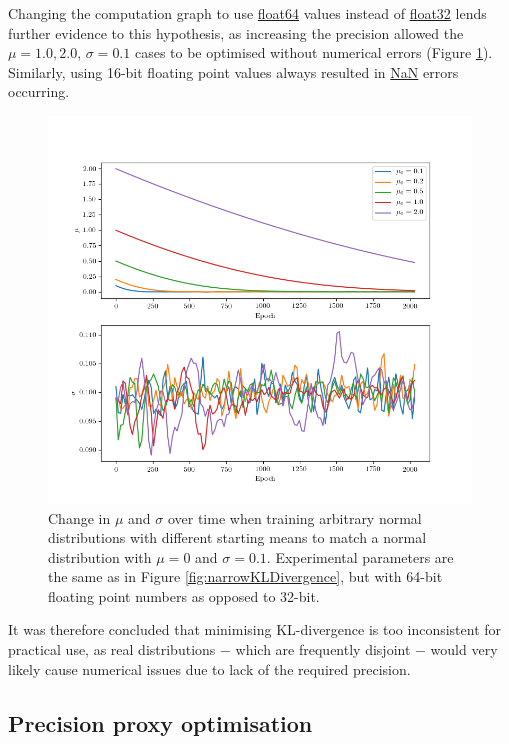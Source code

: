 \documentclass[../../main.tex]{subfiles}
\begin{document}
Changing the computation graph to use \url{float64} values instead of \url{float32} lends further evidence to this hypothesis, as increasing the precision allowed the $\mu=1.0,2.0$, $\sigma=0.1$ cases to be optimised without numerical errors (Figure \ref{fig:narrowKLDivergenceFloat64}).
Similarly, using 16-bit floating point values always resulted in \url{NaN} errors occurring.
\begin{figure}[H]
    \begin{center}
    \includegraphics[width=\textwidth]{narrowKLDivergenceFloat64}
    \caption{
        Change in $\mu$ and $\sigma$ over time when training arbitrary normal distributions with different starting means to match a normal distribution with $\mu=0$ and $\sigma=0.1$. 
        Experimental parameters are the same as in Figure \ref{fig:narrowKLDivergence}, but with 64-bit floating point numbers as opposed to 32-bit.
    }
    \label{fig:narrowKLDivergenceFloat64}
    \end{center}
\end{figure}
It was therefore concluded that minimising KL-divergence is too inconsistent for practical use, as real distributions $-$ which are frequently disjoint $-$ would very likely cause numerical issues due to lack of the required precision.

\subsection{Precision proxy optimisation}
\end{document}
